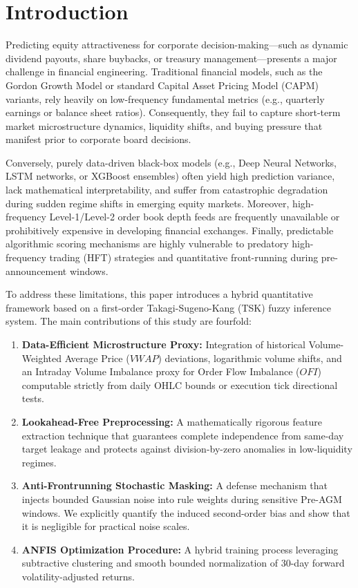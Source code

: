 \documentclass[pdflatex,sn-mathphys-num]{sn-jnl}
\theoremstyle{thmstyleone}
\theoremstyle{thmstyletwo}
\theoremstyle{thmstylethree}
\begin{document}
\section{Introduction}\label{sec1}

Predicting equity attractiveness for corporate decision-making---such as dynamic dividend payouts, share buybacks, or treasury management---presents a major challenge in financial engineering. Traditional financial models, such as the Gordon Growth Model or standard Capital Asset Pricing Model (CAPM) variants, rely heavily on low-frequency fundamental metrics (e.g., quarterly earnings or balance sheet ratios). Consequently, they fail to capture short-term market microstructure dynamics, liquidity shifts, and buying pressure that manifest prior to corporate board decisions.

Conversely, purely data-driven black-box models (e.g., Deep Neural Networks, LSTM networks, or XGBoost ensembles) often yield high prediction variance, lack mathematical interpretability, and suffer from catastrophic degradation during sudden regime shifts in emerging equity markets. Moreover, high-frequency Level-1/Level-2 order book depth feeds are frequently unavailable or prohibitively expensive in developing financial exchanges. Finally, predictable algorithmic scoring mechanisms are highly vulnerable to predatory high-frequency trading (HFT) strategies and quantitative front-running during pre-announcement windows.

To address these limitations, this paper introduces a hybrid quantitative framework based on a first-order Takagi-Sugeno-Kang (TSK) fuzzy inference system. The main contributions of this study are fourfold:
\begin{enumerate}
    \item \textbf{Data-Efficient Microstructure Proxy:} Integration of historical Volume-Weighted Average Price ($VWAP$) deviations, logarithmic volume shifts, and an Intraday Volume Imbalance proxy for Order Flow Imbalance ($OFI$) computable strictly from daily OHLC bounds or execution tick directional tests.
    \item \textbf{Lookahead-Free Preprocessing:} A mathematically rigorous feature extraction technique that guarantees complete independence from same-day target leakage and protects against division-by-zero anomalies in low-liquidity regimes.
    \item \textbf{Anti-Frontrunning Stochastic Masking:} A defense mechanism that injects bounded Gaussian noise into rule weights during sensitive Pre-AGM windows. We explicitly quantify the induced second-order bias and show that it is negligible for practical noise scales.
    \item \textbf{ANFIS Optimization Procedure:} A hybrid training process leveraging subtractive clustering and smooth bounded normalization of 30-day forward volatility-adjusted returns.
\end{enumerate}
\end{document}
